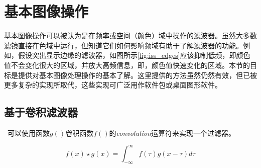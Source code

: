 
\section{基本图像操作}
基本图像操作可以被认为是在频率或空间（颜色）域中操作的滤波器。虽然大多数滤镜直接在色域中运行，但知道它们如何影响频域有助于了解滤波器的功能。例如，假设突出显示边缘的滤波器，如图所示\ref{fig:iss_edges}应该抑制低频，即颜色值不会变化很大的区域，并放大高频信息，即，颜色值快速变化的区域。本节的目标是提供对基本图像处理操作的基本了解。这里提供的方法虽然仍然有效，但已被更多复杂的实现所取代，这些实现可广泛用作软件包或桌面图形软件。



\subsection{基于卷积滤波器}
 可以使用函数$g()$卷积函数$f()$的\emph{convolution}运算符来实现一个过滤器。

\begin{equation}
f(x)\star g(x)=\int_{-\infty}^{\infty}f(\tau)g(x-\tau)d\tau
\end{equation}

